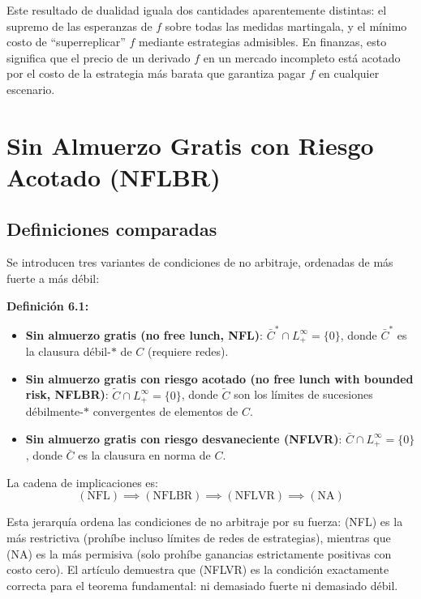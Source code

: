 \documentclass[12pt]{article}
\begin{document}
\begin{intuicionmat}
Este resultado de dualidad iguala dos cantidades aparentemente distintas: el supremo de las esperanzas de $f$ sobre todas las medidas martingala, y el m\'inimo costo de ``superreplicar'' $f$ mediante estrategias admisibles. En finanzas, esto significa que el precio de un derivado $f$ en un mercado incompleto est\'a acotado por el costo de la estrategia m\'as barata que garantiza pagar $f$ en cualquier escenario.
\end{intuicionmat}

\section{Sin Almuerzo Gratis con Riesgo Acotado (NFLBR)}

\subsection{Definiciones comparadas}

Se introducen tres variantes de condiciones de no arbitraje, ordenadas de m\'as fuerte a m\'as d\'ebil:

\textbf{Definici\'on 6.1:}
\begin{itemize}
    \item \textbf{Sin almuerzo gratis (no free lunch, NFL)}: $\bar{C}^* \cap L^\infty_+ = \{0\}$, donde $\bar{C}^*$ es la clausura d\'ebil-$*$ de $C$ (requiere redes).
    \item \textbf{Sin almuerzo gratis con riesgo acotado (no free lunch with bounded risk, NFLBR)}: $\tilde{C} \cap L^\infty_+ = \{0\}$, donde $\tilde{C}$ son los l\'imites de sucesiones d\'ebilmente-$*$ convergentes de elementos de $C$.
    \item \textbf{Sin almuerzo gratis con riesgo desvaneciente (NFLVR)}: $\bar{C} \cap L^\infty_+ = \{0\}$, donde $\bar{C}$ es la clausura en norma de $C$.
\end{itemize}

La cadena de implicaciones es:
\begin{equation}
    (\text{NFL}) \implies (\text{NFLBR}) \implies (\text{NFLVR}) \implies (\text{NA})
\end{equation}

\begin{intuicionmat}
Esta jerarqu\'ia ordena las condiciones de no arbitraje por su fuerza: (NFL) es la m\'as restrictiva (proh\'ibe incluso l\'imites de redes de estrategias), mientras que (NA) es la m\'as permisiva (solo proh\'ibe ganancias estrictamente positivas con costo cero). El art\'iculo demuestra que (NFLVR) es la condici\'on exactamente correcta para el teorema fundamental: ni demasiado fuerte ni demasiado d\'ebil.
\end{intuicionmat}
\end{document}
